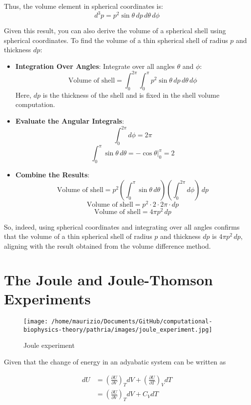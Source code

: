 Thus, the volume element in spherical coordinates is:
\[ d^3p = p^2 \sin\theta \, dp \, d\theta \, d\phi \]


Given this result, you can also derive the volume of a spherical shell using spherical coordinates.
To find the volume of a thin spherical shell of radius \(p\) and thickness \(dp\):

\begin{itemize}
    \item \textbf{Integration Over Angles}:
    Integrate over all angles \(\theta\) and \(\phi\):
    \[
    \text{Volume of shell} = \int_0^{2\pi} \int_0^\pi p^2 \sin \theta \, dp \, d\theta \, d\phi
    \]
    Here, \(dp\) is the thickness of the shell and is fixed in the shell volume computation.
 
    \item \textbf{Evaluate the Angular Integrals}:
    \[
    \int_0^{2\pi} d\phi = 2\pi
    \]
    \[
    \int_0^\pi \sin \theta \, d\theta = \left. -\cos \theta \right|_0^\pi = 2
    \]
 
    \item \textbf{Combine the Results}:
    \[
    \text{Volume of shell} = p^2 \left( \int_0^\pi \sin \theta \, d\theta \right) \left( \int_0^{2\pi} d\phi \right) \, dp
    \]
    \[
    \text{Volume of shell} = p^2 \cdot 2 \cdot 2\pi \cdot dp
    \]
    \[
    \text{Volume of shell} = 4\pi p^2 \, dp
    \]
 
\end{itemize}

So, indeed, using spherical coordinates and integrating over all angles confirms that the volume of a thin spherical shell of radius \(p\) and thickness \(dp\) is \(4 \pi p^2 \, dp\), aligning with the result obtained from the volume difference method.


\section{The Joule and Joule-Thomson Experiments}

\begin{figure}
    \texttt{[image: /home/maurizio/Documents/GitHub/computational-biophysics-theory/pathria/images/joule\_experiment.jpg]}
    \caption{Joule experiment}
\end{figure}

Given that the change of energy in an adyabatic system can be written as

\begin{align*}
    dU &= \left(\frac{\partial U}{\partial V}\right)_T dV + \left(\frac{\partial U}{\partial T}\right)_V dT \\
       &= \left(\frac{\partial U}{\partial V}\right)_T dV + C_V dT
\end{align*}

